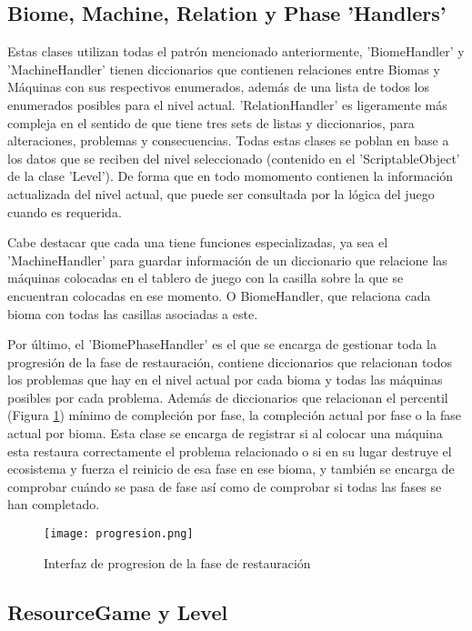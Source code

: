 \subsection{Biome, Machine, Relation y Phase 'Handlers'}

Estas clases utilizan todas el patrón mencionado anteriormente, 'BiomeHandler' y 'MachineHandler' tienen diccionarios que contienen relaciones entre Biomas y Máquinas con sus respectivos enumerados, además de una lista de todos los enumerados posibles para el nivel actual. 'RelationHandler' es ligeramente más compleja en el sentido de que tiene tres sets de listas y diccionarios, para alteraciones, problemas y consecuencias. Todas estas clases se poblan en base a los datos que se reciben del nivel seleccionado (contenido en el 'ScriptableObject' de la clase 'Level'). De forma que en todo momomento contienen la información actualizada del nivel actual, que puede ser consultada por la lógica del juego cuando es requerida. 

Cabe destacar que cada una tiene funciones especializadas, ya sea el 'MachineHandler' para guardar información de un diccionario que relacione las máquinas colocadas en el tablero de juego con la casilla sobre la que se encuentran colocadas en ese momento. O BiomeHandler, que relaciona cada bioma con todas las casillas asociadas a este.

Por último, el 'BiomePhaseHandler' es el que se encarga de gestionar toda la progresión de la fase de restauración, contiene diccionarios que relacionan todos los problemas que hay en el nivel actual por cada bioma y todas las máquinas posibles por cada problema. Además de diccionarios que relacionan el percentil (Figura \ref{fig:progresion}) mínimo de compleción por fase, la compleción actual por fase o la fase actual por bioma. Esta clase se encarga de registrar si al colocar una máquina esta restaura correctamente el problema relacionado o si en su lugar destruye el ecosistema y fuerza el reinicio de esa fase en ese bioma, y también se encarga de comprobar cuándo se pasa de fase así como de comprobar si todas las fases se han completado.

\begin{figure}[H]
    \centering
      \texttt{[image: progresion.png]}
    \caption{Interfaz de progresion de la fase de restauración}
    \label{fig:progresion}
  \end{figure}

\subsection{ResourceGame y Level}


